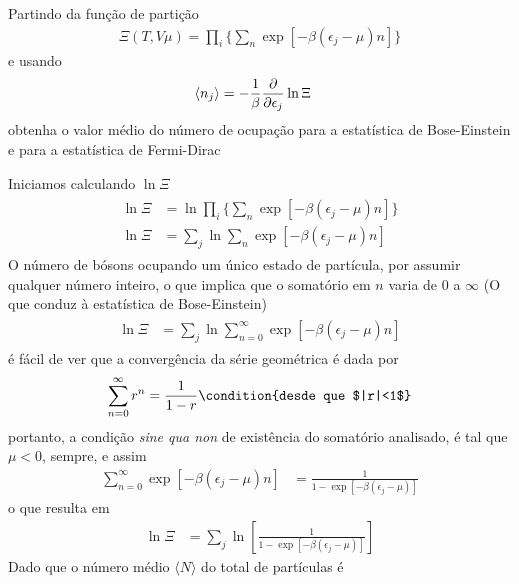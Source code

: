 \begin{prob}
  Partindo da função de partição
  \begin{align}
    \Xi(T,V\mu)=\prod_i\Biggr\{\sum_n\exp{\left[-\beta\left(\epsilon_j -\mu\right)n\right]}\Biggl\}
  \end{align}
  e usando
  \begin{align}
    \langle n_j\rangle&=-\frac{1}{\beta}\frac{\partial {}}{\partial {\epsilon_j}}\ln\Xi
  \end{align}
  obtenha o valor médio do número de ocupação para a estatística de Bose-Einstein e para a estatística de Fermi-Dirac
  \begin{sol}
    Iniciamos calculando $\ln\Xi$
    \begin{align}
      \begin{split}
        \ln\Xi&=\ln\prod_i\Biggr\{\sum_n\exp{\left[-\beta\left(\epsilon_j -\mu\right)n\right]}\Biggl\}\\
        \ln\Xi&=\sum_{j}\ln\sum_n\exp{\left[-\beta\left(\epsilon_j -\mu\right)n\right]}
      \end{split}
    \end{align}
    O número de bósons ocupando um único estado de partícula, por assumir qualquer número inteiro, o que implica que o somatório em $n$ varia de $0$ a $\infty$ (O que conduz à estatística de Bose-Einstein)
    \begin{align}
      \begin{split}
        \ln\Xi&=\sum_{j}\ln\sum_{n=0}^\infty\exp{\left[-\beta\left(\epsilon_j -\mu\right)n\right]}    
      \end{split}
    \end{align}
    é fácil de ver que a convergência da série geométrica é dada por
    \begin{dmath}
      \sum_{n=0}^\infty r^n=\frac{1}{1-r}\condition{desde que $|r|<1$}
    \end{dmath}
    portanto, a condição \emph{sine qua non} de existência do somatório analisado, é tal que $\mu<0$, sempre, e assim
    \begin{align}
      \sum_{n=0}^\infty\exp{\left[-\beta\left(\epsilon_j -\mu\right)n\right]}&=\frac{1}{1-\exp{\left[-\beta\left(\epsilon_j -\mu\right)\right]}}
    \end{align}
    o que resulta em
    \begin{align}
      \ln\Xi&=\sum_{j}\ln\left[\frac{1}{1-\exp{\left[-\beta\left(\epsilon_j -\mu\right)\right]}}\right]
    \end{align}
    Dado que o número médio $\langle N\rangle$ do total de partículas é

\end{sol}
\end{prob}

